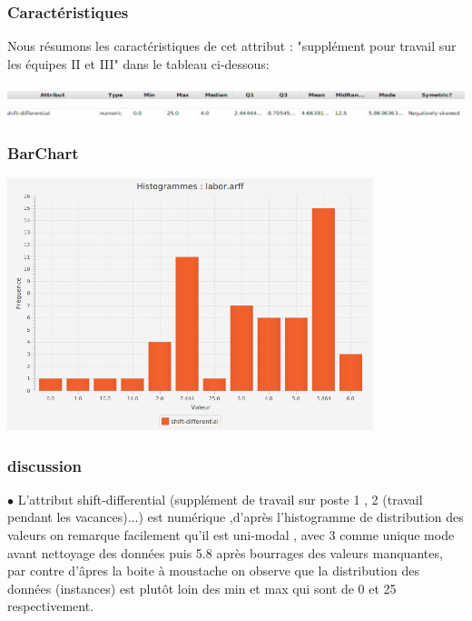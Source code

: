 \documentclass[12pt,a4paper,oneside]{book}
\begin{document}
\subsubsection{Caractéristiques}
Nous résumons les caractéristiques de cet attribut : "supplément pour travail sur les équipes II et III" dans le tableau ci-dessous:
\begin{center}
	\includegraphics[width=1\textwidth]{screens/att.png}\\ \includegraphics[width=1\textwidth]{screens/att-10.png}%
	\label{labelname}%
\end{center}

\subsubsection{BarChart}
\begin{center}
	\includegraphics[width=0.8\textwidth]{screens/barchart/shift-differential-barchart.png}%
	\label{labelname}%
\end{center}

\subsubsection{discussion}
$\bullet$ L'attribut shift-differential (supplément de travail sur poste 1 , 2 (travail pendant les vacances)...) est numérique ,d'après l'histogramme de distribution des valeurs on remarque facilement qu'il est uni-modal , avec 3 comme unique mode avant nettoyage des données puis 5.8 après bourrages des valeurs manquantes, par contre d'âpres la boite à moustache on observe que la distribution des données (instances) est plutôt loin des min et max qui sont de 0 et 25 respectivement. \\
\end{document}
